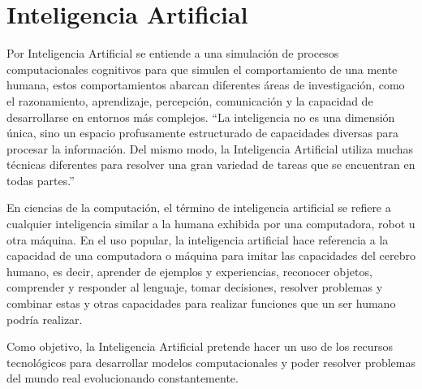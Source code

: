 \documentclass[12pt, a4paper, titlepage]{report}
\begin{document}
		\section{Inteligencia Artificial}
		Por Inteligencia Artificial se entiende a una simulación de procesos computacionales cognitivos para que simulen el comportamiento de una mente humana, estos comportamientos abarcan diferentes áreas de investigación, como el razonamiento, aprendizaje, percepción, comunicación y la capacidad de desarrollarse en entornos más complejos.
		“La inteligencia no es una dimensión única, sino un espacio profusamente estructurado de capacidades diversas para procesar la información. Del mismo modo, la Inteligencia Artificial utiliza muchas técnicas diferentes para resolver una gran variedad de tareas que se encuentran en todas partes.” \cite{Inteligencia_Artificial}\par
		En ciencias de la computación, el término de inteligencia artificial se refiere a cualquier inteligencia similar a la humana exhibida por una computadora, robot u otra máquina. En el uso popular, la inteligencia artificial hace referencia a la capacidad de una computadora o máquina para imitar las capacidades del cerebro humano, es decir, aprender de ejemplos y experiencias, reconocer objetos, comprender y responder al lenguaje, tomar decisiones, resolver problemas y combinar estas y otras capacidades para realizar funciones que un ser humano podría realizar. \cite{refInteligencia_Artificial2}\par
		Como objetivo, la Inteligencia Artificial pretende hacer un uso de los recursos tecnológicos para desarrollar modelos computacionales y poder resolver problemas del mundo real evolucionando constantemente.
\end{document}
